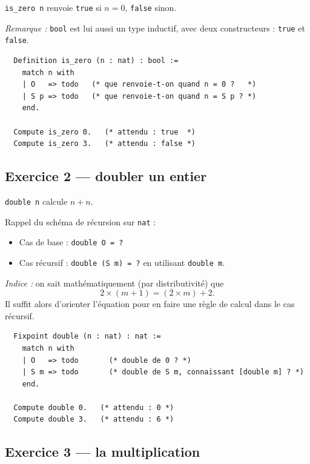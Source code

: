 \documentclass[11pt,a4paper]{article}
\newenvironment{exo}{
\begin{mdframed}[style=exostyle]}{
\end{mdframed}}
\newcommand{\cq}[1]{\texttt{#1}}
\begin{document}
\cq{is_zero n} renvoie \cq{true} si $n = 0$, \cq{false} sinon.

\textit{Remarque :} \cq{bool} est lui aussi un type inductif, avec deux
constructeurs : \cq{true} et \cq{false}.

\begin{exo}
\begin{verbatim}
  Definition is_zero (n : nat) : bool :=
    match n with
    | O   => todo   (* que renvoie-t-on quand n = 0 ?   *)
    | S p => todo   (* que renvoie-t-on quand n = S p ? *)
    end.

  Compute is_zero 0.   (* attendu : true  *)
  Compute is_zero 3.   (* attendu : false *)
\end{verbatim}
\end{exo}

\subsection{Exercice 2 — doubler un entier}

\cq{double n} calcule $n + n$.

Rappel du schéma de récursion sur \cq{nat} :
\begin{itemize}[noitemsep,topsep=2pt]
  \item Cas de base : \cq{double O = ?}
  \item Cas récursif : \cq{double (S m) = ?} en utilisant \cq{double m}.
\end{itemize}

\textit{Indice :} on sait mathématiquement (par distributivité) que
\[
  2 \times (m + 1) = (2 \times m) + 2.
\]
Il suffit alors d'orienter l'équation pour en faire une règle de calcul
dans le cas récursif.

\begin{exo}
\begin{verbatim}
  Fixpoint double (n : nat) : nat :=
    match n with
    | O   => todo       (* double de 0 ? *)
    | S m => todo       (* double de S m, connaissant [double m] ? *)
    end.

  Compute double 0.   (* attendu : 0 *)
  Compute double 3.   (* attendu : 6 *)
\end{verbatim}
\end{exo}

\subsection{Exercice 3 — la multiplication}
\end{document}
